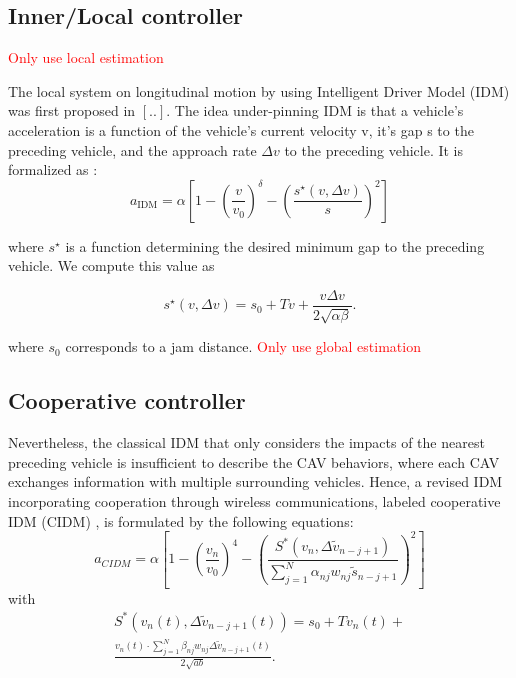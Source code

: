 \documentclass[letterpaper, 10pt, conference]{ieeeconf}  %
\begin{document}
\subsection{Inner/Local controller}
\textcolor{red}{ Only use local estimation }

 The local system on longitudinal motion by using Intelligent Driver Model (IDM) was first proposed in $[..]$.
 The idea under-pinning IDM is that a vehicle's acceleration is a function of the vehicle's current velocity v, it's gap s
 to the preceding vehicle, and the approach rate $\Delta v$ to the preceding vehicle. It is formalized as :
 \begin{equation}
    a_{\mathrm{IDM}}=\alpha\left[1-\left(\frac{v}{v_0}\right)^\delta-\left(\frac{s^{\star}(v, \Delta v)}{s}\right)^2\right]
 \end{equation}

where $s^{\star}$ is a function determining the desired minimum gap to the preceding vehicle. We compute this value as

\begin{equation}
s^{\star}(v, \Delta v)=s_0+T v+\frac{v \Delta v}{2 \sqrt{\alpha \beta}}.    
\end{equation}

where $s_0$ corresponds to a jam distance. 
\textcolor{red}{ Only use global estimation}
\subsection{Cooperative controller}
Nevertheless, the classical IDM that only considers the impacts of the nearest preceding vehicle is insufficient to describe the CAV
behaviors, where each CAV exchanges information with multiple surrounding vehicles. Hence, a revised IDM incorporating cooperation through wireless communications, labeled cooperative IDM (CIDM) \cite{C_IDM}, is formulated by the following equations:
\begin{equation}\label{CIDM}
a_{CIDM}=\alpha \left[1-\left(\frac{v_n}{v_0}\right)^4-\left(\frac{S^{*}\left(v_n, \Delta \tilde{v}_{n-j+1}\right)}{\sum_{j=1}^N \alpha_{n j} w_{n j} \tilde{{s}}_{n-j+1}}\right)^2\right] 
\end{equation}
with
\begin{equation*}
\begin{aligned}
    S^{*}\left(v_n(t), \Delta \widetilde{v}_{n-j+1}(t)\right)=s_0+T v_n(t)+ \\ \frac{v_n(t) \cdot \sum_{j=1}^N \beta_{n j} w_{n j} \Delta \tilde{v}_{n-j+1}(t)}{2 \sqrt{a b}} .
\end{aligned}
\end{equation*}
\end{document}
